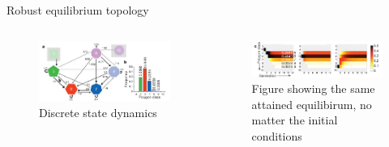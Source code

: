\documentclass[aspectratio=169, 10pt]{beamer}
\begin{document}
\begin{frame}[fragile]{Robust equilibrium topology}
  \begin{columns}[onlytextwidth]
    \begin{figure}
      \centering
      \includegraphics[width=\textwidth]{presentation/figures/fig2a.png}
      \caption{Discrete state dynamics}
    \end{figure}
    \begin{figure}
      \centering
      \includegraphics[width=\textwidth]{presentation/figures/fig2c.png}
      \caption{Figure showing the same attained equilibirum, no matter the initial conditions}
    \end{figure}
  \end{columns}  
\end{frame}
\end{document}
